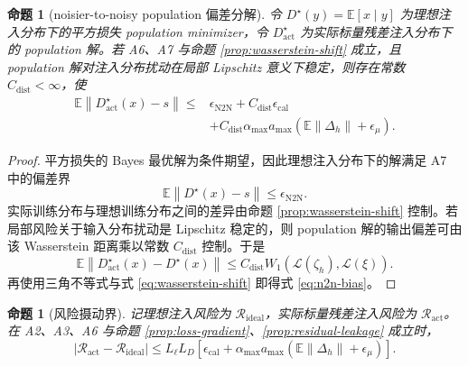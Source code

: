 \documentclass[11pt,a4paper,UTF8,fontset=fandol]{ctexart}
\newtheorem{proposition}[theorem]{命题}
\theoremstyle{definition}
\newcommand{\norm}[1]{\left\lVert#1\right\rVert}
\newcommand{\abs}[1]{\left\lvert#1\right\rvert}
\newcommand{\E}{\mathbb{E}}
\begin{document}
\begin{proposition}[noisier-to-noisy population 偏差分解]
\label{prop:n2n-bias}
令 $D^\star(y)=\E[x\mid y]$ 为理想注入分布下的平方损失 population minimizer，令 $D^\star_{\mathrm{act}}$ 为实际标量残差注入分布下的 population 解。若 A6、A7 与命题 \ref{prop:wasserstein-shift} 成立，且 population 解对注入分布扰动在局部 Lipschitz 意义下稳定，则存在常数 $C_{\mathrm{dist}}<\infty$，使
\begin{equation}
\label{eq:n2n-bias}
\begin{aligned}
    \E\norm{D^\star_{\mathrm{act}}(x)-s}
    \le&
    \epsilon_{\mathrm{N2N}}
    +C_{\mathrm{dist}}\epsilon_{\mathrm{cal}}\\
    &+C_{\mathrm{dist}}\alpha_{\max}a_{\max}
    \left(
    \E\norm{\Delta_h}+\epsilon_\mu
    \right).
\end{aligned}
\end{equation}
\end{proposition}

\begin{proof}
平方损失的 Bayes 最优解为条件期望，因此理想注入分布下的解满足 A7 中的偏差界
\begin{equation}
    \E\norm{D^\star(x)-s}\le\epsilon_{\mathrm{N2N}}.
\end{equation}
实际训练分布与理想训练分布之间的差异由命题 \ref{prop:wasserstein-shift} 控制。若局部风险关于输入分布扰动是 Lipschitz 稳定的，则 population 解的输出偏差可由该 Wasserstein 距离乘以常数 $C_{\mathrm{dist}}$ 控制。于是
\begin{equation}
    \E\norm{D^\star_{\mathrm{act}}(x)-D^\star(x)}
    \le C_{\mathrm{dist}}
    W_1(\mathcal L(\zeta_h),\mathcal L(\xi)).
\end{equation}
再使用三角不等式与式 \eqref{eq:wasserstein-shift} 即得式 \eqref{eq:n2n-bias}。
\end{proof}

\begin{proposition}[风险摄动界]
\label{prop:risk-perturbation}
记理想注入风险为 $\mathcal R_{\mathrm{ideal}}$，实际标量残差注入风险为 $\mathcal R_{\mathrm{act}}$。在 A2、A3、A6 与命题 \ref{prop:loss-gradient}、\ref{prop:residual-leakage} 成立时，
\begin{equation}
\label{eq:risk-perturbation}
    \abs{\mathcal R_{\mathrm{act}}-\mathcal R_{\mathrm{ideal}}}
    \le
    L_\ell L_D
    \left[
    \epsilon_{\mathrm{cal}}
    +\alpha_{\max}a_{\max}
    \left(
    \E\norm{\Delta_h}+\epsilon_\mu
    \right)
    \right].
\end{equation}
\end{proposition}
\end{document}

